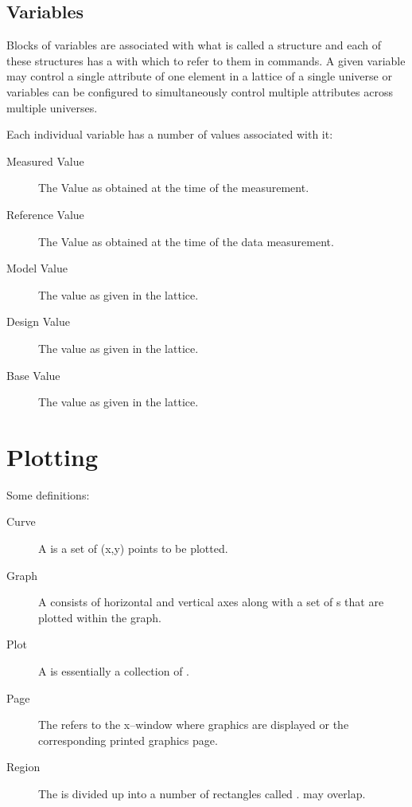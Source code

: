 \subsection{Variables}

Blocks of variables are associated with what is called a
 structure and each of these structures has a 
with which to refer to them in \tao commands. A given variable may
control a single attribute of one element in a  lattice
of a single universe or variables can be configured to simultaneously
control multiple attributes across multiple universes.

Each individual variable has a number of values associated with it:
  \vspace*{-3ex}
  \begin{description}
  \item[Measured Value] \Newline
The Value as obtained at the time of the  measurement.
  \item[Reference Value] \Newline
The Value as obtained at the time of the  data  measurement.
  \item[Model Value] \Newline
The value as given in the  lattice.
  \item[Design Value] \Newline
The value as given in the  lattice.
  \item[Base Value] \Newline
The value as given in the  lattice.
  \end{description}

\section{Plotting}

Some definitions:
  \vspace*{-3ex}
\begin{description}
\item[Curve] \Newline
A  is a set of (x,y) points to be plotted.
\item[Graph] \Newline
A  consists of horizontal and vertical axes along with a set
of s that are plotted within the graph. 
\item[Plot] \Newline
A  is essentially a collection of .
\item[Page] \Newline
The  refers to the x--window where graphics are displayed or the 
corresponding printed graphics page.
\item[Region] \Newline
The  is divided up into a number of rectangles called
.  may overlap.
\end{description}

